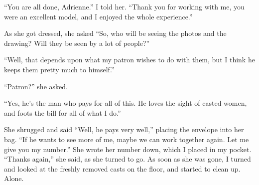 ``You are all done, Adrienne.'' I told her. ``Thank you for working with me, you were an
excellent model, and I enjoyed the whole experience.''

As she got dressed, she asked ``So, who will be seeing the photos and the drawing? Will they
be seen by a lot of people?''

``Well, that depends upon what my patron wishes to do with them, but I think he keeps them
pretty much to himself.''

``Patron?'' she asked.

``Yes, he's the man who pays for all of this. He loves the sight of casted women, and foots
the bill for all of what I do.''

She shrugged and said ``Well, he pays very well,'' placing the envelope into her bag. ``If
he wants to see more of me, maybe we can work together again. Let me give you my number.'' She
wrote her number down, which I placed in my pocket. ``Thanks again,'' she said, as she turned to
go. As soon as she was gone, I turned and looked at the freshly removed casts on the floor, and
started to clean up. Alone.
